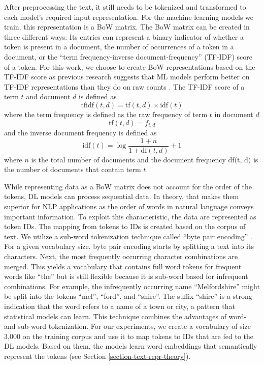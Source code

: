 After preprocessing the text, it still needs to be tokenized and transformed to each model's required input representation. For the machine learning models we train, this representation is a BoW matrix. The BoW matrix can be created in three different ways: Its entries can represent a binary indicator of whether a token is present in a document, the number of occurrences of a token in a document, or the ``term frequency-inverse document-frequency'' (TF-IDF) score of a token. For this work, we choose to create BoW representations based on the TF-IDF score as previous research suggests that ML models perform better on TF-IDF representations than they do on raw counts .
The TF-IDF score of a term $t$ and document $d$ is defined as
\begin{equation}
	\textrm{tfidf}(t, d) = \textrm{tf}(t, d) \times \textrm{idf}(t)
\end{equation}
where the term frequency is defined as the raw frequency of term $t$ in document $d$
\begin{equation}
	 \textrm{tf}(t, d) = f_{t,d}
\end{equation}
and the inverse document frequency is defined as
\begin{equation}
	\textrm{idf}(t) = \log \frac{1+n}{1+\textrm{df}(t, d)} + 1
\end{equation}
where $n$ is the total number of documents and the document frequency $\textrm{df(t, d)}$ is the number of documents that contain term $t$. 

While representing data as a BoW matrix does not account for the order of the tokens, DL models can process sequential data. In theory, that makes them superior for NLP applications as the order of words in natural language conveys important information. To exploit this characteristic, the data are represented as token IDs. The mapping from tokens to IDs is created based on the corpus of text. We utilize a sub-word tokenization technique called ``byte pair encoding'' . For a given vocabulary size, byte pair encoding starts by splitting a text into its characters. Next, the most frequently occurring character combinations are merged. This yields a vocabulary that contains full word tokens for frequent words like ``the'' but is still flexible because it is sub-word based for infrequent combinations. For example, the infrequently occurring name ``Melfordshire'' might be split into the tokens ``mel'', ``ford'', and ``shire''. The suffix ``shire'' is a strong indication that the word refers to a name of a town or city, a pattern that statistical models can learn. This technique combines the advantages of word- and sub-word tokenization. For our experiments, we create a vocabulary of size 3,000 on the training corpus and use it to map tokens to IDs that are fed to the DL models. Based on them, the models learn word embeddings that semantically represent the tokens (see Section \ref{section-text-repr-theory}).




